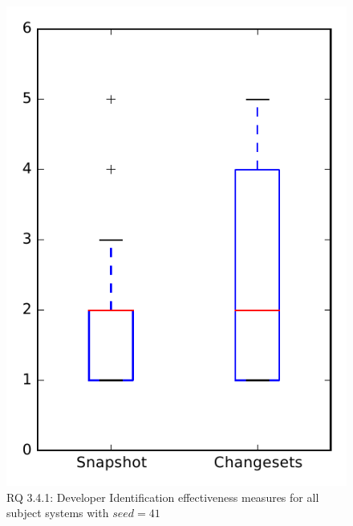 
\begin{figure}
\centering
\includegraphics[height=0.4\textheight]{figures/dit_seed/rq1_overview_41}
\caption{RQ 3.4.1: Developer Identification effectiveness measures for all subject systems with $seed=41$}
\label{fig:dit_seed:rq1:overview}
\end{figure}
